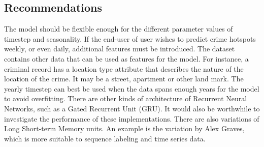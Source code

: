 \subsection{Recommendations}
    The model should be flexible enough for the different parameter values of timestep and seasonality. If the end-user of user wishes to predict crime hotspots weekly, or even daily, additional features must be introduced. The dataset contains other data that can be used as features for the model. For instance, a criminal record has a location type attribute that describes the nature of the location of the crime. It may be a street, apartment or other land mark. The yearly timestep can best be used when the data spans enough years for the model to avoid overfitting.
    There are other kinds of architecture of Recurrent Neural Networks, such as a Gated Recurrent Unit (GRU). It would also be worthwhile to investigate the performance of these implementations.
    There are also variations of Long Short-term Memory units. An example is the variation by Alex Graves, which is more suitable to sequence labeling and time series data.